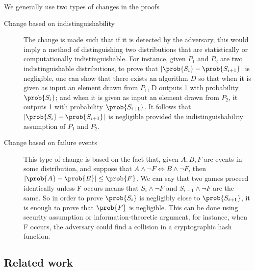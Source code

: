 We generally use two types of changes in the proofs
\begin{description}
\item[Change based on indistinguishability] The change is made such that if it
  is detected by the adversary, this would imply a method of distinguishing two
  distributions that are statistically or computationally indistinguishable. For
  instance, given $P_{1}$ and $P_{2}$ are two indistinguishable distributions,
  to prove that $|\prob{S_{i}} - \prob{S_{i+1}}|$ is negligible, one can show
  that there exists an algorithm $D$ so that when it is given as input an
  element drawn from $P_{1}$, D outputs 1 with probability $\prob{S_{i}}$; and
  when it is given as input an element drawn from $P_{2}$, it outputs 1 with
  probability $\prob{S_{i+1}}$. It follows that
  $|\prob{S_{i}} - \prob{S_{i+1}}|$ is negligible provided the
  indistinguishability assumption of $P_{1}$ and $P_{2}$.
\item[Change based on failure events] This type of change is based on the fact
  that, given $A,B,F$ are events in some distribution, and suppose that
  $A \wedge \neg F \iff B \wedge \neg F$, then
  $|\prob{A} - \prob{B}| \leq \prob{F}$. We can say that two games proceed
  identically unless F occurs means that $S_{i} \wedge \neg F$ and
  $S_{i+1} \wedge \neg F$ are the same. So in order to prove $\prob{S_{i}}$ is
  negligibly close to $\prob{S_{i+1}}$, it is enough to prove that $\prob{F}$ is
  negligible. This can be done using security assumption or
  information-theoretic argument, for instance, when F occurs, the adversary
  could find a collision in a cryptographic hash function.
\end{description}

\subsection{Related work}
\label{sec:proofRelatedWork}

